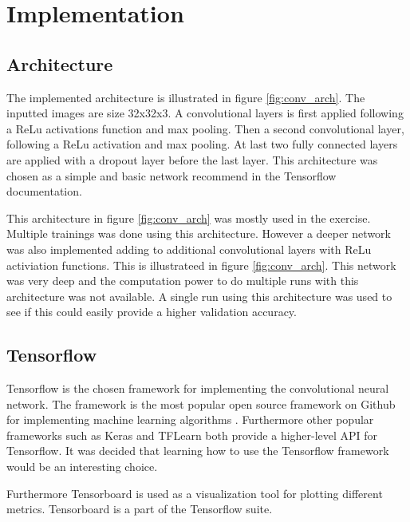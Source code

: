 \chapter{Implementation}
\label{chp:imp}

\section{Architecture}
The implemented architecture is illustrated in figure \ref{fig:conv_arch}. The inputted images are size 32x32x3. A convolutional layers is first applied following a ReLu activations function and max pooling. Then a second convolutional layer, following a ReLu activation and max pooling. At last two fully connected layers are applied with a dropout layer before the last layer. This architecture was chosen as a simple and basic network recommend in the Tensorflow documentation.


This architecture in figure \ref{fig:conv_arch} was mostly used in the exercise. Multiple trainings was done using this architecture. However a deeper network was also implemented adding to additional convolutional layers with ReLu activiation functions. This is illustrateed in figure \ref{fig:conv_arch}. This network was very deep and the computation power to do multiple runs with this architecture was not available. A single run using this architecture was used to see if this could easily provide a higher validation accuracy.



\section{Tensorflow}
Tensorflow is the chosen framework for implementing the convolutional neural network. The framework is the most popular open source framework on Github for implementing machine learning algorithms \citep{ML_frameworks}. Furthermore other popular frameworks such as Keras and TFLearn both provide a higher-level API for Tensorflow. It was decided that learning how to use the Tensorflow framework would be an interesting choice.

Furthermore Tensorboard is used as a visualization tool for plotting different metrics. Tensorboard is a part of the Tensorflow suite.

